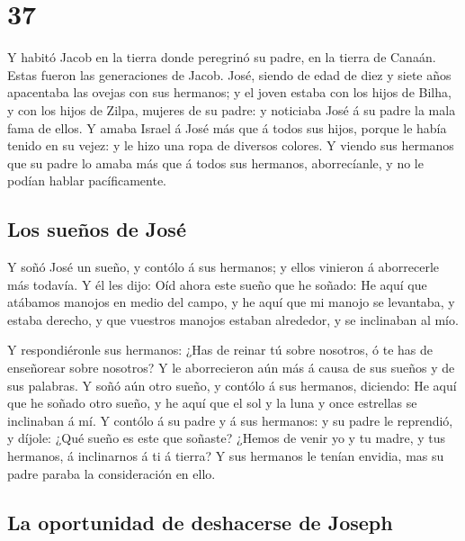 \hypertarget{section-01-37}{%
\section{37}\label{section-01-37}}

 Y habitó Jacob en la tierra donde peregrinó su padre, en
la tierra de Canaán.  Estas fueron las generaciones de
Jacob. José, siendo de edad de diez y siete años apacentaba las ovejas
con sus hermanos; y el joven estaba con los hijos de Bilha, y con los
hijos de Zilpa, mujeres de su padre: y noticiaba José á su padre la mala
fama de ellos.  Y amaba Israel á José más que á todos sus
hijos, porque le había tenido en su vejez: y le hizo una ropa de
diversos colores.  Y viendo sus hermanos que su padre lo
amaba más que á todos sus hermanos, aborrecíanle, y no le podían hablar
pacíficamente.

\hypertarget{los-sueuxf1os-de-josuxe9}{%
\subsection{Los sueños de José}\label{los-sueuxf1os-de-josuxe9}}

 Y soñó José un sueño, y contólo á sus hermanos; y ellos
vinieron á aborrecerle más todavía.  Y él les dijo: Oíd
ahora este sueño que he soñado:  He aquí que atábamos
manojos en medio del campo, y he aquí que mi manojo se levantaba, y
estaba derecho, y que vuestros manojos estaban alrededor, y se
inclinaban al mío.

 Y respondiéronle sus hermanos: ¿Has de reinar tú sobre
nosotros, ó te has de enseñorear sobre nosotros? Y le aborrecieron aún
más á causa de sus sueños y de sus palabras.  Y soñó aún
otro sueño, y contólo á sus hermanos, diciendo: He aquí que he soñado
otro sueño, y he aquí que el sol y la luna y once estrellas se
inclinaban á mí.  Y contólo á su padre y á sus hermanos:
y su padre le reprendió, y díjole: ¿Qué sueño es este que soñaste?
¿Hemos de venir yo y tu madre, y tus hermanos, á inclinarnos á ti á
tierra?  Y sus hermanos le tenían envidia, mas su padre
paraba la consideración en ello.

\hypertarget{la-oportunidad-de-deshacerse-de-joseph}{%
\subsection{La oportunidad de deshacerse de
Joseph}\label{la-oportunidad-de-deshacerse-de-joseph}}

